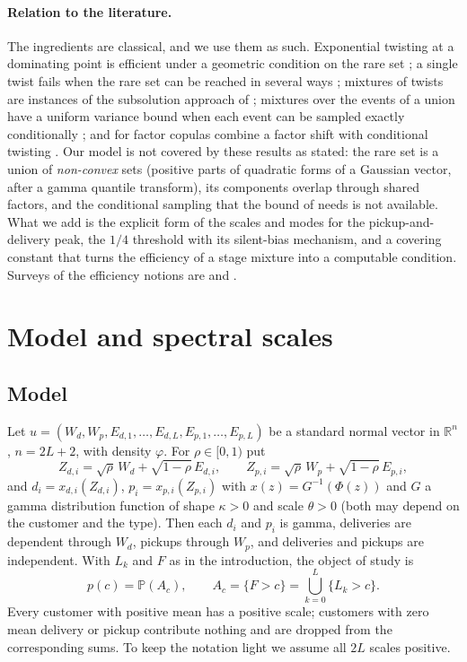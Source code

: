 \documentclass[11pt]{article}
\theoremstyle{definition}
\theoremstyle{remark}
\renewcommand{\P}{\mathbb{P}}
\newcommand{\R}{\mathbb{R}}
\begin{document}
\paragraph{Relation to the literature.}
The ingredients are classical, and we use them as such. Exponential twisting at a
dominating point is efficient under a geometric condition on the rare set
\citep{SadowskyBucklew1990,Bucklew2004}; a single twist fails when the rare set can be
reached in several ways \citep{GlassermanWang1997}; mixtures of twists are instances of
the subsolution approach of \citet{DupuisWang2007}; mixtures over the events of a union
have a uniform variance bound when each event can be sampled exactly conditionally
\citep{OwenMaximovChertkov2019}; and for factor copulas \citet{GlassermanLi2005} combine a
factor shift with conditional twisting \citep[see also][]{BassambooJunejaZeevi2008}. Our
model is not covered by these results as stated: the rare set is a union of
\emph{non-convex} sets (positive parts of quadratic forms of a Gaussian vector, after a
gamma quantile transform), its components overlap through shared factors, and the
conditional sampling that the bound of \citeauthor{OwenMaximovChertkov2019} needs is not
available. What we add is the explicit form of the scales and modes for the
pickup-and-delivery peak, the $1/4$ threshold with its silent-bias mechanism, and a
covering constant that turns the efficiency of a stage mixture into a computable
condition. Surveys of the efficiency notions are \citet{AsmussenGlynn2007} and
\citet{Bucklew2004}.

\section{Model and spectral scales}
\label{sec:model}

\subsection{Model}
Let $u=(W_d,W_p,E_{d,1},\dots,E_{d,L},E_{p,1},\dots,E_{p,L})$ be a standard normal vector
in $\R^n$, $n=2L+2$, with density $\varphi$. For $\rho\in[0,1)$ put
\[
Z_{d,i}=\sqrt\rho\,W_d+\sqrt{1-\rho}\,E_{d,i},\qquad Z_{p,i}=\sqrt\rho\,W_p+\sqrt{1-\rho}\,E_{p,i},
\]
and $d_i=x_{d,i}(Z_{d,i})$, $p_i=x_{p,i}(Z_{p,i})$ with $x(z)=G^{-1}(\Phi(z))$ and $G$ a
gamma distribution function of shape $\kappa>0$ and scale $\theta>0$ (both may depend on
the customer and the type). Then each $d_i$ and $p_i$ is gamma, deliveries are
dependent through $W_d$, pickups through $W_p$, and deliveries and pickups are
independent. With $L_k$ and $F$ as in the introduction, the object of study is
\[
p(c)=\P(A_c),\qquad A_c=\{F>c\}=\bigcup_{k=0}^L\{L_k>c\}.
\]
Every customer with positive mean has a positive scale; customers with zero mean
delivery or pickup contribute nothing and are dropped from the corresponding sums.
To keep the notation light we assume all $2L$ scales positive.
\end{document}
